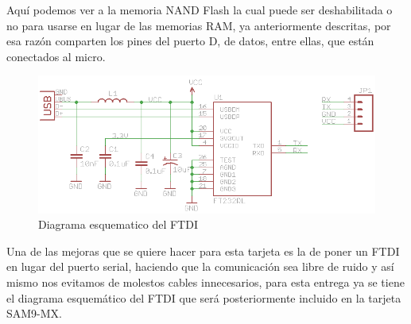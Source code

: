 Aqu\'i podemos ver a la memoria NAND Flash la cual puede ser deshabilitada o no para usarse en lugar de las memorias RAM, ya anteriormente descritas, por esa raz\'on comparten los pines del puerto D, de datos,  entre ellas, que est\'an conectados al micro.\medskip

\begin{figure}[H]
\centering
\includegraphics[scale=0.9]{ftdiEsquematico}
\caption{Diagrama esquematico del FTDI}\label{fig:ftdiEsquematico}
\end{figure}

Una de las mejoras que se quiere hacer para esta tarjeta es la de poner un FTDI en lugar del puerto serial, haciendo que la comunicaci\'on sea libre de ruido y as\'i mismo nos evitamos de molestos cables innecesarios, para esta entrega ya se tiene el diagrama esquem\'atico del FTDI que ser\'a posteriormente incluido en la tarjeta SAM9-MX.\medskip

